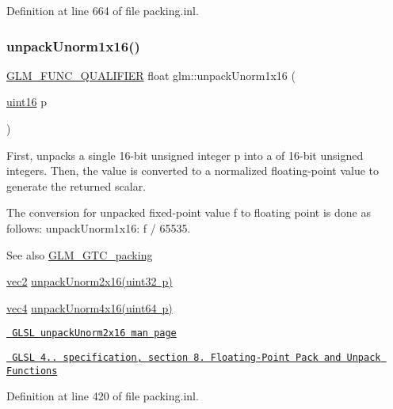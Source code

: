 Definition at line 664 of file packing.\+inl.

\mbox{\label{group__gtc__packing_ga7770e3ade4f4764cc1b2eb42ac4ec188}} 
\subsubsection{\texorpdfstring{unpackUnorm1x16()}{unpackUnorm1x16()}}
{\footnotesize\ttfamily \mbox{\hyperlink{setup_8hpp_a33fdea6f91c5f834105f7415e2a64407}{G\+L\+M\+\_\+\+F\+U\+N\+C\+\_\+\+Q\+U\+A\+L\+I\+F\+I\+ER}} float glm\+::unpack\+Unorm1x16 (\begin{DoxyParamCaption}\item[{\mbox{\hyperlink{group__gtc__type__precision_gad8c2939e1fdd8e5828b31d95c52255d5}{uint16}}}]{p }\end{DoxyParamCaption})}

First, unpacks a single 16-\/bit unsigned integer p into a of 16-\/bit unsigned integers. Then, the value is converted to a normalized floating-\/point value to generate the returned scalar.

The conversion for unpacked fixed-\/point value f to floating point is done as follows\+: unpack\+Unorm1x16\+: f / 65535.

\begin{DoxySeeAlso}{See also}
\mbox{\hyperlink{group__gtc__packing}{G\+L\+M\+\_\+\+G\+T\+C\+\_\+packing}} 

\mbox{\hyperlink{group__core__types_gaa1618f51db67eaa145db101d8c8431d8}{vec2}} \mbox{\hyperlink{group__core__func__packing_ga11776a74e1885a14e1295d6e917a9ae2}{unpack\+Unorm2x16(uint32 p)}} 

\mbox{\hyperlink{group__core__types_ga5881b1b022d7fd1b7218f5916532dd02}{vec4}} \mbox{\hyperlink{group__gtc__packing_gafb2b502bc406031a5618ce930139a9e3}{unpack\+Unorm4x16(uint64 p)}} 

\href{http://www.opengl.org/sdk/docs/manglsl/xhtml/unpackUnorm2x16.xml}{\texttt{ G\+L\+SL unpack\+Unorm2x16 man page}} 

\href{http://www.opengl.org/registry/doc/GLSLangSpec.4.20.8.pdf}{\texttt{ G\+L\+SL 4.. specification, section 8. Floating-\/\+Point Pack and Unpack Functions}} 
\end{DoxySeeAlso}


Definition at line 420 of file packing.\+inl.

